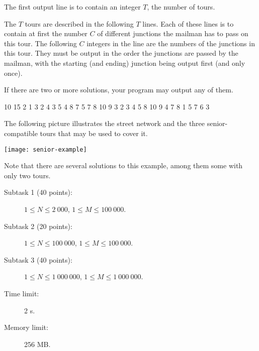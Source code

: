 \documentclass{boi2014}
\begin{document}
    \Output
    The first output line is to contain an integer $T$, the number of tours.

    The $T$ tours are described in the following $T$ lines. Each of these lines
    is to contain at first the number $C$ of different junctions the mailman has
    to pass on this tour. The following $C$ integers in the line are the numbers
    of the junctions in this tour. They must be output in the order the
    junctions are passed by the mailman, with the starting (and ending) junction
    being output first (and only once).

    If there are two or more solutions, your program may output any of them.

    \Example

    \example
    {
        10 15  2  1 3  2 4  3 5  4 8  7  5 7  8  10  9
    }
    {
        3  2 3 4 5 8 10 9  4 7 8  1 5 7 6 3
    }
    {
        The following picture illustrates the street network and the three
        senior-compatible tours that may be used to cover it.

        \texttt{[image: senior-example]}

        Note that there are several solutions to this example, among them some
        with only two tours.
    
    }

    \Scoring

    \begin{description}
        \item[Subtask 1 (40 points):] $1 \le N \le 2\ 000$, $1 \le M \le 100\ 000$.
        \item[Subtask 2 (20 points):] $1 \le N \le 100\ 000$, $1 \le M \le 100\ 000$.
        \item[Subtask 3 (40 points):] $1 \le N \le 1\ 000\ 000$, $1 \le M \le 1\ 000\ 000$.
    \end{description}

    \Constraints

    \begin{description}
        \item[Time limit:] 2 s.
        \item[Memory limit:] 256 MB.
    \end{description}
\end{document}
